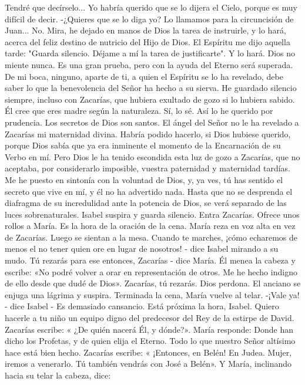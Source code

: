 \documentclass[12pt]{book} %
\begin{document}
Tendré que decírselo... Yo habría querido que se lo dijera el Cielo, porque es muy difícil de decir. 
-¿Quieres que se lo diga yo? Lo llamamos para la circuncisión de Juan... 
No. Mira, he dejado en manos de Dios la tarea de instruirle, y lo hará, acerca del feliz destino de nutricio del Hijo de Dios. El Espíritu me dijo aquella tarde: "Guarda silencio. Déjame a mí la tarea de justificarte". Y lo hará. Dios no miente nunca. Es una gran prueba, pero con la ayuda del Eterno será superada. De mi boca, ninguno, aparte de ti, a quien el Espíritu se lo ha revelado, debe saber lo que la benevolencia del Señor ha hecho a su sierva. 
He guardado silencio siempre, incluso con Zacarías, que hubiera exultado de gozo si lo hubiera sabido. Él cree que eres 
madre según la naturaleza. 
Sí, lo sé. Así lo he querido por prudencia. Los secretos de Dios son santos. El ángel del Señor no le ha revelado a Zacarías mi maternidad divina. Habría podido hacerlo, si Dios hubiese querido, porque Dios sabía que ya era inminente el momento de la Encarnación de su Verbo en mí. Pero Dios le ha tenido escondida esta luz de gozo a Zacarías, que no aceptaba, por considerarlo imposible, vuestra paternidad y maternidad tardías. Me he puesto en sintonía con la voluntad de Dios, y, ya ves, tú has sentido el secreto que vive en mí, y él no ha advertido nada. Hasta que no se desprenda el diafragma de su incredulidad ante la potencia de Dios, se verá separado de las luces sobrenaturales. 
Isabel suspira y guarda silencio. 
Entra Zacarías. Ofrece unos rollos a María. Es la hora de la oración de la cena. María reza en voz alta en vez de Zacarías. Luego se sientan a la mesa. 
Cuando te marches, ¡cómo echaremos de menos el no tener quien ore en lugar de nosotros! - dice Isabel mirando a su mudo. 
Tú rezarás para ese entonces, Zacarías - dice María. 
Él menea la cabeza y escribe: «No podré volver a orar en representación de otros. Me he hecho indigno de ello desde que dudé de Dios». 
Zacarías, tú rezarás. Dios perdona. 
El anciano se enjuga una lágrima y suspira. 
Terminada la cena, María vuelve al telar. 
-¡Vale ya! - dice Isabel - Es demasiado cansancio. 
Está próxima la hora, Isabel. Quiero hacerle a tu niño un equipo digno del predecesor del Rey de la estirpe de David. Zacarías escribe: « ¿De quién nacerá Él, y dónde?». María responde: 
Donde han dicho los Profetas, y de quien elija el Eterno. Todo lo que nuestro Señor altísimo hace está bien hecho. 
Zacarías escribe: « ¡Entonces, en Belén! En Judea. Mujer, iremos a venerarlo. Tú también vendrás con José a Belén». Y María, inclinando hacia su telar la cabeza, dice: 
\end{document}
